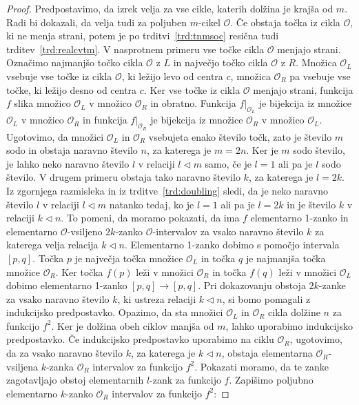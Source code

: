 \documentclass[../TG_magistrsko_delo_sections.tex]{subfiles}
\begin{document}
\begin{proof}
Predpostavimo, da izrek velja za vse cikle, katerih dolžina je krajša od $m$. Radi bi dokazali, da velja tudi za poljuben $m$-cikel $\mathcal{O}$. Če obstaja točka iz cikla $\mathcal{O}$, ki ne menja strani, potem je po trditvi~\ref{trd:tnmsoc} resična tudi trditev~\ref{trd:realcvtm}. V nasprotnem primeru vse točke cikla $\mathcal{O}$ menjajo strani. Označimo najmanjšo točko cikla $\mathcal{O}$  z $L$ in največjo točko cikla $\mathcal{O}$ z $R$. Množica $\mathcal{O}_L$ vsebuje vse točke iz cikla $\mathcal{O}$, ki ležijo levo od centra $c$, množica $\mathcal{O}_R$ pa vsebuje vse točke, ki ležijo desno od centra $c$. Ker vse točke iz cikla $\mathcal{O}$ menjajo strani, funkcija $f$ slika množico $\mathcal{O}_L$ v množico $\mathcal{O}_R$ in obratno. Funkcija $f|_{\mathcal{O}_L}$ je bijekcija iz množice $\mathcal{O}_L$ v množico $\mathcal{O}_R$ in funkcija $f|_{\mathcal{O}_R}$ je bijekcija iz množice $\mathcal{O}_R$ v množico $\mathcal{O}_L$. Ugotovimo, da množici $\mathcal{O}_L$ in $\mathcal{O}_R$ vsebujeta enako število točk, zato je število $m$ sodo in obstaja naravno število $n$, za katerega je $m = 2 n$. Ker je $m$ sodo število, je lahko neko naravno število $l$ v relaciji $l \triangleleft m$ samo, če je $l=1$ ali pa je $l$ sodo število. V drugem primeru obstaja tako naravno število $k$, za katerega je $l = 2 k$. Iz zgornjega razmisleka in iz trditve~\ref{trd:doubling} sledi, da je neko naravno število $l$ v relaciji $l \triangleleft m$ natanko tedaj, ko je $l=1$ ali pa je $l=2k$ in je število $k$ v relaciji $k \triangleleft n$. To pomeni, da moramo pokazati, da ima $f$ elementarno 1-zanko in elementarno $\mathcal{O}$-vsiljeno $2k$-zanko $\mathcal{O}$-intervalov za vsako naravno število $k$ za katerega velja relacija $k \triangleleft n$. Elementarno 1-zanko dobimo s pomočjo intervala $[p, q]$. Točka $p$ je največja točka množice $\mathcal{O}_L$ in točka $q$ je najmanjša točka množice $\mathcal{O}_R$. Ker točka $f(p)$ leži v množici $\mathcal{O}_R$ in točka $f(q)$ leži v množici $\mathcal{O}_L$ dobimo elementarno 1-zanko $[p, q] \to [p, q]$.
Pri dokazovanju obstoja $2k$-zanke za vsako naravno število $k$, ki ustreza relaciji $k \triangleleft n$, si bomo pomagali z indukcijsko predpostavko. Opazimo, da sta množici $\mathcal{O}_L$ in $\mathcal{O}_R$  cikla dolžine $n$ za funkcijo $f^2$. Ker je dolžina obeh ciklov manjša od $m$, lahko uporabimo indukcijsko predpostavko. Če indukcijsko predpostavko uporabimo na ciklu $\mathcal{O}_R$, ugotovimo, da za vsako naravno število $k$, za katerega je $k \triangleleft n$, obstaja elementarna $\mathcal{O}_R$-vsiljena $k$-zanka $\mathcal{O}_R$ intervalov za funkcijo $f^2$. Pokazati moramo, da te zanke zagotavljajo obstoj elementarnih $l$-zank za funkcijo $f$. Zapišimo poljubno elementarno $k$-zanko $\mathcal{O}_R$ intervalov za funkcijo $f^2$:

\end{proof}
\end{document}
